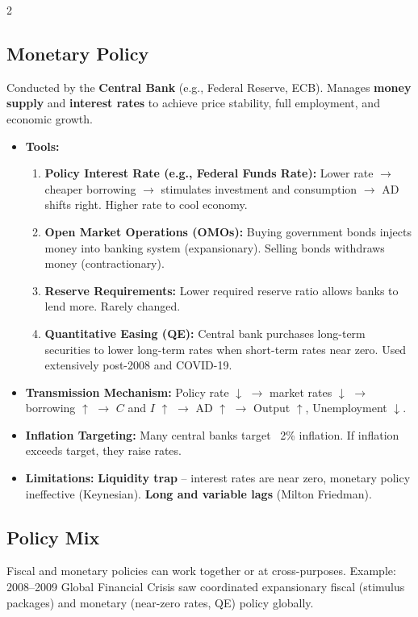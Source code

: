 \documentclass[10pt,a4paper]{article}
\begin{document}
\begin{multicols}{2}
\subsection*{Monetary Policy}
Conducted by the \textbf{Central Bank} (e.g., Federal Reserve, ECB). Manages \textbf{money supply} and \textbf{interest rates} to achieve price stability, full employment, and economic growth.
\begin{itemize}[leftmargin=*,nosep]
    \item \textbf{Tools:}
    \begin{enumerate}[nosep]
        \item \textbf{Policy Interest Rate (e.g., Federal Funds Rate):} Lower rate $\to$ cheaper borrowing $\to$ stimulates investment and consumption $\to$ AD shifts right. Higher rate to cool economy.
        \item \textbf{Open Market Operations (OMOs):} Buying government bonds injects money into banking system (expansionary). Selling bonds withdraws money (contractionary).
        \item \textbf{Reserve Requirements:} Lower required reserve ratio allows banks to lend more. Rarely changed.
        \item \textbf{Quantitative Easing (QE):} Central bank purchases long-term securities to lower long-term rates when short-term rates near zero. Used extensively post-2008 and COVID-19.
    \end{enumerate}
    \item \textbf{Transmission Mechanism:} Policy rate $\downarrow$ $\to$ market rates $\downarrow$ $\to$ borrowing $\uparrow$ $\to$ $C$ and $I$ $\uparrow$ $\to$ AD $\uparrow$ $\to$ Output $\uparrow$, Unemployment $\downarrow$.
    \item \textbf{Inflation Targeting:} Many central banks target ~2\% inflation. If inflation exceeds target, they raise rates.
    \item \textbf{Limitations:} \textbf{Liquidity trap} -- interest rates are near zero, monetary policy ineffective (Keynesian). \textbf{Long and variable lags} (Milton Friedman).
\end{itemize}

\subsection*{Policy Mix}
Fiscal and monetary policies can work together or at cross-purposes. Example: 2008--2009 Global Financial Crisis saw coordinated expansionary fiscal (stimulus packages) and monetary (near-zero rates, QE) policy globally.


\end{multicols}
\end{document}
